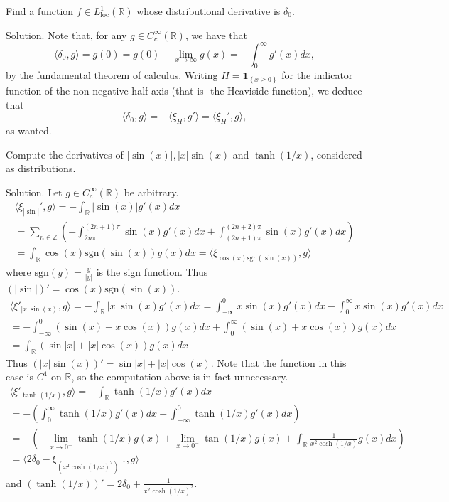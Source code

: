 \documentclass[12pt, draft,reqno,a4paper, twoside]{amsproc}
\newcommand{\id}{\mathbf{1}}
\newcommand{\dbZ}{\mathbb Z}
\newcommand{\dbR}{\mathbb R}
\newcommand{\gen}[1]{\langle{#1}\rangle}
\newcommand{\set}[1]{\left\{{#1}\right\}}
\newcommand{\abs}[1]{\left|#1\right|}
\newcommand{\loc}{\mathrm{loc}}
\newenvironment{sol}{\sc Solution. \rm}{\hfill \qedsymbol\bigskip}
\begin{document}
\begin{exer}Find a function $f\in L_\loc^1(\dbR)$ whose distributional derivative is $\delta_0$.
\end{exer}

\begin{sol}
Note that, for any $g\in C_c^\infty(\dbR)$, we have that 
\[\gen{\delta_0,g}=g(0)=g(0)-\lim_{x\to\infty}g(x)=-\int_{0}^\infty g'(x)dx,\]
by the fundamental theorem of calculus. Writing $H=\id_{\set{x\ge 0}}$ for the indicator function of the non-negative half axis (that is- the Heaviside function), we deduce that \[\gen{\delta_0,g}=-\gen{\xi_H,g'}=\gen{\xi_H',g},\]
as wanted.
\end{sol}

\begin{exer}Compute the derivatives of $\abs{\sin(x)},\abs{x}{\sin(x)}$ and $\tanh(1/x)$, considered as distributions.
\end{exer}
\begin{sol}Let $g\in C_c^\infty(\dbR)$ be arbitrary.
%
\begin{multline*}
\gen{\xi_{\abs{\sin}}',g}=-\int_{\dbR}\abs{\sin(x)}g'(x)dx\\
=\sum_{n\in\dbZ}\left(-\int_{2n\pi}^{(2n+1)\pi}\sin(x)g'(x)dx+\int_{(2n+1)\pi}^{(2n+2)\pi}\sin(x)g'(x)dx\right)\\
=\int_{\dbR}\cos(x)\mathrm{sgn}(\sin(x))g(x)dx=\gen{\xi_{\cos(x)\mathrm{sgn}(\sin(x))},g}
\end{multline*}\nopagebreak
where $\mathrm{sgn}(y)=\frac{y}{\abs{y}}$ is the sign function. Thus $(\abs{\sin})'=\cos(x)\mathrm{sgn}(\sin(x))$.
%
\begin{multline*}
\gen{\xi'_{\abs{x}\sin(x)},g}=-\int_{\dbR}\abs{x}\sin(x)g'(x)dx=\int_{-\infty}^0 x\sin(x)g'(x)dx-\int_{0}^\infty x\sin(x)g'(x)dx\\=-\int_{-\infty}^0 (\sin(x)+x\cos(x))g(x)dx+\int_0^\infty (\sin(x)+x\cos(x))g(x)dx\\
=\int_\dbR(\sin\abs{x}+\abs{x}\cos(x))g(x)dx
\end{multline*}
Thus $(\abs{x}\sin(x))'=\sin\abs{x}+\abs{x}\cos(x)$. Note that the function in this case is $C^1$ on $\dbR$, so the computation above is in fact unnecessary.
%
\begin{multline*}\gen{\xi'_{\tanh(1/x)},g}=-\int_{\dbR}\tanh(1/x)g'(x)dx\\
=-\left(\int_0^\infty\tanh(1/x)g'(x)dx+\int_{-\infty}^0\tanh(1/x)g'(x)dx\right)\\
=-\left(-\lim_{x\to 0^+}\tanh(1/x)g(x)+\lim_{x\to 0^-}\tan(1/x)g(x)+\int_\dbR\frac{1}{x^2\cosh(1/x)}g(x)dx\right)\\=\gen{2\delta_0-\xi_{(x^2\cosh(1/x)^2)^{-1}},g}
\end{multline*}
and $(\tanh(1/x))'=2\delta_0+\frac{1}{x^2\cosh(1/x)^2}$. 
\end{sol}
\end{document}
